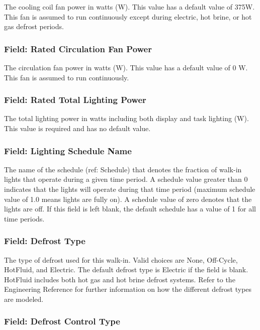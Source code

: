 The cooling coil fan power in watts (W). This value has a default value of 375W. This fan is assumed to run continuously except during electric, hot brine, or hot gas defrost periods.

\subsubsection{Field: Rated Circulation Fan Power}\label{field-rated-circulation-fan-power}

The circulation fan power in watts (W). This value has a default value of 0 W. This fan is assumed to run continuously.

\subsubsection{Field: Rated Total Lighting Power}\label{field-rated-total-lighting-power}

The total lighting power in watts including both display and task lighting (W). This value is required and has no default value.

\subsubsection{Field: Lighting Schedule Name}\label{field-lighting-schedule-name}

The name of the schedule (ref: Schedule) that denotes the fraction of walk-in lights that operate during a given time period. A schedule value greater than 0 indicates that the lights will operate during that time period (maximum schedule value of 1.0 means lights are fully on). A schedule value of zero denotes that the lights are off. If this field is left blank, the default schedule has a value of 1 for all time periods.

\subsubsection{Field: Defrost Type}\label{field-defrost-type}

The type of defrost used for this walk-in. Valid choices are None, Off-Cycle, HotFluid, and Electric. The default defrost type is Electric if the field is blank. HotFluid includes both hot gas and hot brine defrost systems. Refer to the Engineering Reference for further information on how the different defrost types are modeled.

\subsubsection{Field: Defrost Control Type}\label{field-defrost-control-type}

